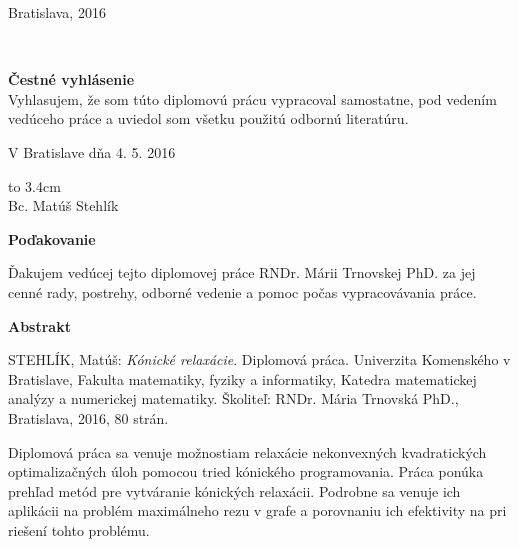 \documentclass[12pt]{book}
\theoremstyle{definition}
\def\mfplacedate{Bratislava, 2016}
\begin{document}
\hfill\mfplacedate
\eject %







\eject %

{~}\vspace{12cm}

\noindent
\begin{minipage}{1\textwidth}
{\bf Čestné vyhlásenie} \\
Vyhlasujem, že som túto diplomovú prácu vypracoval samostatne, pod vedením vedúceho práce a uviedol som všetku použitú odbornú literatúru.\\

\medskip

V Bratislave dňa 4. 5. 2016

\bigskip\bigskip

\hfill\hbox to 3.4cm{\dotfill} \\
\medskip
\hfill{Bc. Matúš Stehlík}\\ 
\end{minipage}
\vfill\null\eject %

{\large\bf Poďakovanie}

\medskip

Ďakujem vedúcej tejto diplomovej práce RNDr. Márii Trnovskej PhD. za jej cenné rady, postrehy, odborné vedenie a pomoc počas vypracovávania práce.

\vfill\null\eject


{\large\bf Abstrakt}

\medskip

STEHLÍK, Matúš: {\it Kónické relaxácie}. Diplomová práca. Univerzita Komenského v Bratislave, Fakulta matematiky, fyziky a informatiky, Katedra matematickej analýzy a numerickej matematiky. Školiteľ: RNDr. Mária Trnovská PhD., Bratislava, 2016, 80 strán.

\bigskip

Diplomová práca sa venuje možnostiam relaxácie nekonvexných kvadratických optimalizačných úloh pomocou tried kónického programovania. Práca ponúka prehľad metód pre vytváranie kónických relaxácii. Podrobne sa venuje ich aplikácii na problém maximálneho rezu v grafe a porovnaniu ich efektivity na pri riešení tohto problému.


\end{document}

